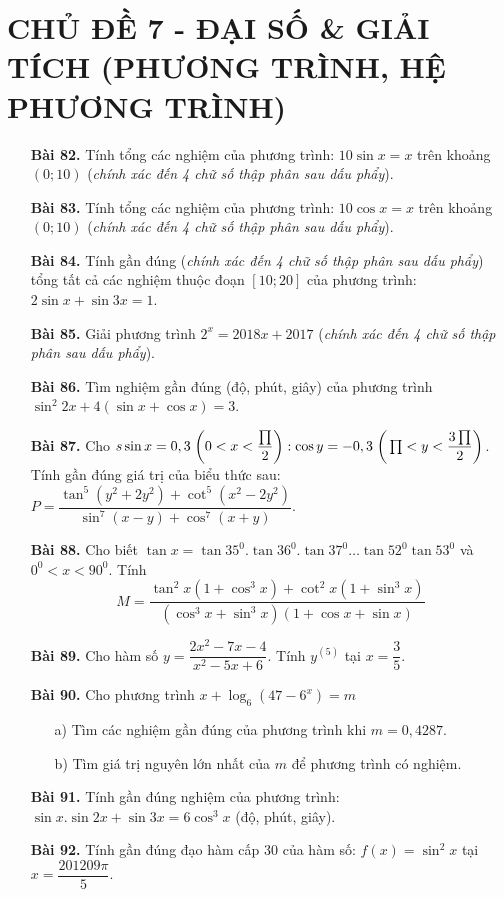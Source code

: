 \documentclass[12pt,a4paper]{article}
\begin{document}
\section*{CHỦ ĐỀ 7 - ĐẠI SỐ \& GIẢI TÍCH (PHƯƠNG TRÌNH, HỆ PHƯƠNG TRÌNH)}
\begin{enumerate}
\item[\textbf{Bài 82.}] Tính tổng các nghiệm của phương trình: $10\sin x = x$ trên khoảng $(0;10)$ (\textit{chính xác đến 4 chữ số thập phân sau dấu phẩy}).
\item[\textbf{Bài 83.}] Tính tổng các nghiệm của phương trình: $10\cos x = x$ trên khoảng $(0;10)$ (\textit{chính xác đến 4 chữ số thập phân sau dấu phẩy}).
\item[\textbf{Bài 84.}] Tính gần đúng (\textit{chính xác đến 4 chữ số thập phân sau dấu phẩy}) tổng tất cả các nghiệm thuộc đoạn $[10;20]$ của phương trình: $2\sin x + \sin 3x = 1.$
\item[\textbf{Bài 85.}] Giải phương trình $2^x = 2018x + 2017$ (\textit{chính xác đến 4 chữ số thập phân sau dấu phẩy}).
\item[\textbf{Bài 86.}] Tìm nghiệm gần đúng (độ, phút, giây) của phương trình $\sin^2 2x + 4(\sin x + \cos x) = 3$.
\item[\textbf{Bài 87.}] Cho $s\sin x = 0,3 \thickspace\bigg(0 < x < \dfrac{\prod}{2}\bigg): \cos y = -0,3\thickspace\bigg( \prod < y < \dfrac{3\prod}{2}\bigg)$. Tính gần đúng giá trị của biểu thức sau: $P = \dfrac{\tan^5 (y^2 + 2y^2) + \cot^5 (x^2 - 2y^2)}{\sin^7 (x-y) + \cos^7 (x+y)}.$
\item[\textbf{Bài 88.}] Cho biết $\tan x = \tan 35^0.\tan 36^0.\tan 37^0\ldots\tan 52^0\tan 53^0$ và $0^0 < x < 90^0$. Tính
$$M = \frac{\tan^2 x(1+\cos^3 x) + \cot^2 x(1+\sin^3 x)}{(\cos^3 x + \sin^3 x)(1 + \cos x + \sin x)}$$
\item[\textbf{Bài 89.}] Cho hàm số $y = \dfrac{2x^2 - 7x - 4}{x^2 - 5x + 6}$. Tính $y^{(5)}$ tại $x = \dfrac{3}{5}$.
\item[\textbf{Bài 90.}] Cho phương trình $x + \log_6 (47-6^x) = m$
\begin{enumerate}
\item[a)] Tìm các nghiệm gần đúng của phương trình khi $m = 0,4287$.
\item[b)] Tìm giá trị nguyên lớn nhất của $m$ để phương trình có nghiệm.
\end{enumerate}
\item[\textbf{Bài 91.}] Tính gần đúng nghiệm của phương trình: $\sin x.\sin 2x + \sin 3x = 6\cos^3 x$ (độ, phút, giây).
\item[\textbf{Bài 92.}] Tính gần đúng đạo hàm cấp 30 của hàm số: $f(x) = \sin^2 x$ tại $x = \dfrac{201209\pi}{5}$.

\end{enumerate}
\end{document}
